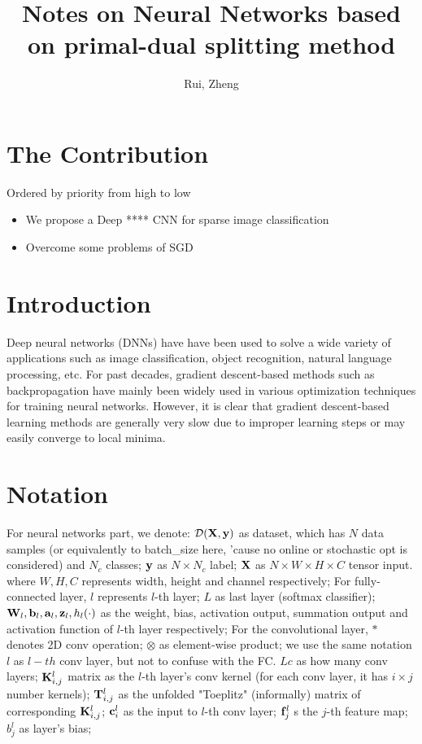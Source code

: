 \documentclass[11pt,a4paper]{article}
\title{Notes on Neural Networks based on primal-dual splitting method }
\author{Rui, Zheng}
\begin{document}
\maketitle

\tableofcontents
\section{The Contribution}
Ordered by priority from high to low
\begin{itemize}
	\item We propose a Deep **** CNN for sparse image classification
	\item Overcome some problems of SGD
\end{itemize}
\section{Introduction}
Deep neural networks (DNNs) have  have been used to solve a wide variety of applications such as image classification, object recognition, natural language processing, etc. For past decades, gradient descent-based methods such as backpropagation have mainly been widely used in various optimization techniques for training neural networks. However, it is clear that gradient descent-based learning methods are generally very slow due to improper learning steps or may easily converge to local minima.
\section{Notation}
For neural networks part, we denote:  $\mathcal{D}(\mathbf{X}, \mathbf{y})$ as dataset, which has $N$ data samples (or equivalently to batch\_size here, 'cause no online or stochastic opt is considered) and $N_c$ classes; $\mathbf{y}$ as $N \times N_c$ label; $\mathbf{X}$ as $N \times W \times H \times C$ tensor input. where $W, H, C$ represents width, height and channel respectively; For fully-connected layer, $l$ represents $l$-th layer; $L$ as last layer (softmax classifier); $\mathbf{W}_l, \mathbf{b}_l, \mathbf{a}_l, \mathbf{z}_l, h_l(\cdot)$ as the weight, bias, activation output, summation output and activation function of $l$-th layer respectively; For the convolutional layer, $*$ denotes 2D conv operation; $\otimes$ as element-wise product; we use the same notation $l$ as $l-th$ conv layer, but not to confuse with the FC. $Lc$ as how many conv layers;  $\mathbf{K}_{i,j}^l$ matrix as the $l$-th layer's conv kernel (for each conv layer, it has $i\times j$ number kernels); $\mathbf{T}^l_{i,j}$ as the unfolded "Toeplitz" (informally) matrix of corresponding $\mathbf{K}_{i,j}^l$; $\mathbf{c}^l_i$ as the input to $l$-th conv layer; $\mathbf{f}^l_j$ s the $j$-th feature map; $b^l_j$ as layer's bias; 
\end{document}
